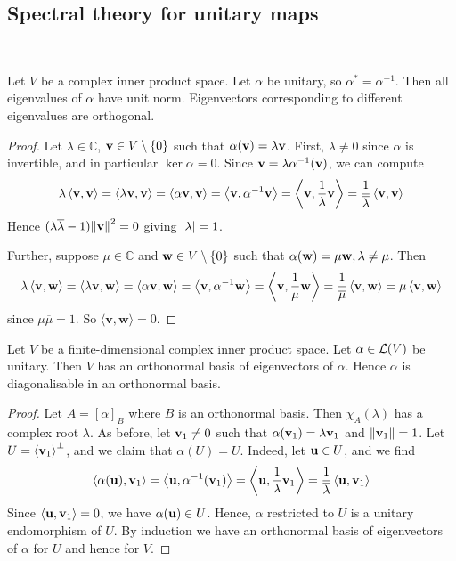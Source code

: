\documentclass[a4paper]{article}
\begin{document}
\subsection{Spectral theory for unitary maps}
\ \vspace*{-1.5em}
\begin{lemma}
	Let \( V \) be a complex inner product space.
	Let \( \alpha \) be unitary, so \( \alpha^* = \alpha^{-1} \).
	Then all eigenvalues of \( \alpha \) have unit norm.
	Eigenvectors corresponding to different eigenvalues are orthogonal.
\end{lemma}
\begin{proof}
	Let \( \lambda \in \mathbb C \), \( {\bf v} \in V \setminus \qty{0} \) such that \( \alpha({\bf v}) = \lambda {\bf v} \).
	First, \( \lambda \neq 0 \) since \( \alpha \) is invertible, and in particular \( \ker \alpha = \qty{0} \).
	Since \( {\bf v} = \lambda \alpha^{-1}({\bf v}) \), we can compute
	\[
		\lambda \left\langle{{\bf v},{\bf v}}\right\rangle = \left\langle{\lambda {\bf v}, {\bf v}}\right\rangle = \left\langle{\alpha {\bf v}, {\bf v}}\right\rangle = \left\langle{{\bf v}, \alpha^{-1} {\bf v}}\right\rangle = \left\langle{{\bf v}, \frac{1}{\lambda} {\bf v}}\right\rangle = \frac{1}{\overline \lambda} \left\langle{{\bf v}, {\bf v}}\right\rangle
	\]
	Hence \( (\lambda \overline \lambda - 1) \norm{{\bf v}}^2 = 0 \) giving \( \abs{\lambda} = 1 \).

	Further, suppose \( \mu \in \mathbb C \) and \( {\bf w} \in V \setminus \qty{0} \) such that \( \alpha({\bf w}) = \mu {\bf w}, \lambda \neq \mu \).
	Then
	\[
		\lambda \left\langle{{\bf v},{\bf w}}\right\rangle = \left\langle{\lambda {\bf v}, {\bf w}}\right\rangle = \left\langle{\alpha {\bf v}, {\bf w}}\right\rangle = \left\langle{{\bf v}, \alpha^{-1} {\bf w}}\right\rangle = \left\langle{{\bf v}, \frac{1}{\mu} {\bf w}}\right\rangle = \frac{1}{\overline \mu} \left\langle{{\bf v},{\bf w}}\right\rangle = \mu \left\langle{{\bf v},{\bf w}}\right\rangle
	\]
	since \( \mu \overline \mu = 1 \). So $ \langle \mathbf{v},\mathbf{w} \rangle = 0 $.
\end{proof}
\begin{theorem}
	Let \( V \) be a finite-dimensional complex inner product space.
	Let \( \alpha \in {\mathcal{L}}(V) \) be unitary.
	Then \( V \) has an orthonormal basis of eigenvectors of \( \alpha \).
	Hence \( \alpha \) is diagonalisable in an orthonormal basis.
\end{theorem}
\begin{proof}
	Let \( A = [\alpha]_B \) where \( B \) is an orthonormal basis.
	Then \( \chi_A(\lambda) \) has a complex root \( \lambda \).
	As before, let \( {\bf v}_1 \neq 0 \) such that \( \alpha({\bf v}_1) = \lambda {\bf v}_1 \) and \(\norm{{\bf v}_1} = 1 \).
	Let \( U = \left\langle{} {\bf v}_1 \right\rangle^\perp \), and we claim that \( \alpha(U) = U \).
	Indeed, let \( {\bf u} \in U \), and we find
	\[
		\left\langle{\alpha({\bf u}), {\bf v}_1}\right\rangle = \left\langle{{\bf u}, \alpha^{-1}({\bf v}_1)}\right\rangle = \left\langle{{\bf u}, \frac{1}{\lambda} {\bf v}_1}\right\rangle = \frac{1}{\overline \lambda} \left\langle{{\bf u},{\bf v}_1}\right\rangle
	\]
	Since \( \left\langle{{\bf u}, {\bf v}_1}\right\rangle = 0 \), we have \( \alpha({\bf u}) \in U \).
	Hence, \( \alpha \) restricted to \( U \) is a unitary endomorphism of \( U \).
	By induction we have an orthonormal basis of eigenvectors of \( \alpha \) for \( U \) and hence for \( V \).
\end{proof}
\end{document}
